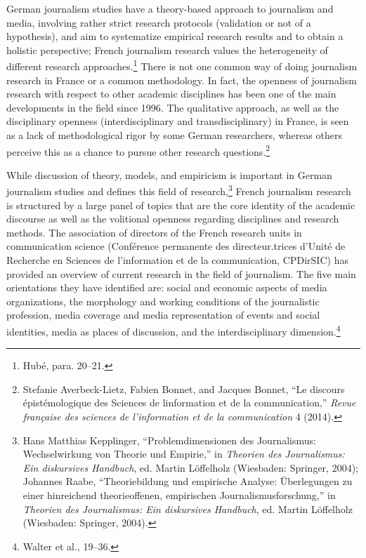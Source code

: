 \documentclass{tufte-handout}
\begin{document}
German journalism studies have a theory-based approach to journalism and
media, involving rather strict research protocols (validation or not of
a hypothesis), and aim to systematize empirical research results and to
obtain a holistic perspective; French journalism research values the
heterogeneity of different research approaches.\footnote{Hubé, para.
  20--21.} There is not one common way of doing journalism research in
France or a common methodology. In fact, the openness of journalism
research with respect to other academic disciplines has been one of the
main developments in the field since 1996. The qualitative approach, as
well as the disciplinary openness (interdisciplinary and
transdisciplinary) in France, is seen as a lack of methodological rigor
by some German researchers, whereas others perceive this as a chance to
pursue other research questions.\footnote{Stefanie Averbeck-Lietz,
  Fabien Bonnet, and Jacques Bonnet, ``Le discours épistémologique des
  Sciences de l\textquotesingle information et de la communication,''
  \emph{Revue française des sciences de l'information et de la
  communication} 4 (2014).}

While discussion of theory, models, and empiricism is important in
German journalism studies and defines this field of research,\footnote{Hans
  Matthias Kepplinger, ``Problemdimensionen des Journalismus:
  Wechselwirkung von Theorie und Empirie,'' in \emph{Theorien des
  Journalismus: Ein diskursives Handbuch}, ed. Martin Löffelholz
  (Wiesbaden: Springer, 2004); Johannes Raabe, ``Theoriebildung und
  empirische Analyse: Überlegungen zu einer hinreichend theorieoffenen,
  empirischen Journalismusforschung,'' in \emph{Theorien des
  Journalismus: Ein diskursives Handbuch}, ed. Martin Löffelholz
  (Wiesbaden: Springer, 2004).} French journalism research is structured
by a large panel of topics that are the core identity of the academic
discourse as well as the volitional openness regarding disciplines and
research methods. The association of directors of the French research
units in communication science (Conférence permanente des
directeur.trices d'Unité de Recherche en Sciences de l'information et de
la communication, CPDirSIC) has provided an overview of current research
in the field of journalism. The five main orientations they have
identified are: social and economic aspects of media organizations, the
morphology and working conditions of the journalistic profession, media
coverage and media representation of events and social identities, media
as places of discussion, and the interdisciplinary dimension.\footnote{Walter
  et al., 19­--36.}
\end{document}
